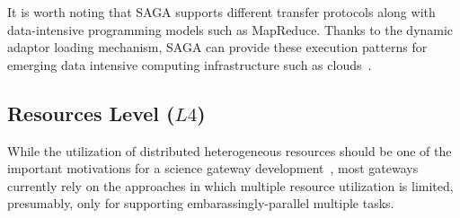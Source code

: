 \documentclass[]{svjour3}
\begin{document}
It is worth noting that SAGA supports different transfer protocols
along with data-intensive programming models such as MapReduce.
Thanks to the dynamic adaptor loading mechanism, SAGA can provide
these execution patterns for emerging data intensive computing
infrastructure such as clouds~\cite{bigjob_cloudcom10,saga_bigjob_condor_cloud}.











\subsection{Resources Level ($L4$)} 

While the utilization of distributed heterogeneous resources should be
one of the important motivations for a science gateway
development~,  most gateways currently rely on the
approaches in which multiple resource utilization is limited,
presumably, only for supporting embarassingly-parallel multiple
tasks.~ 
\end{document}
